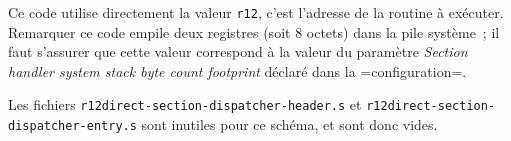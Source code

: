 Ce code utilise directement la valeur \texttt{r12}, c'est l'adresse de la routine à exécuter. Remarquer ce code empile deux registres (soit 8 octets) dans la pile système~; il faut s'assurer que cette valeur correspond à la valeur du paramètre \emph{Section handler system stack byte count footprint} déclaré dans la \omnibus=configuration=.


Les fichiers \texttt{r12direct-section-dispatcher-header.s} et \texttt{r12direct-section-dispatcher-entry.s} sont inutiles pour ce schéma, et sont donc vides.





